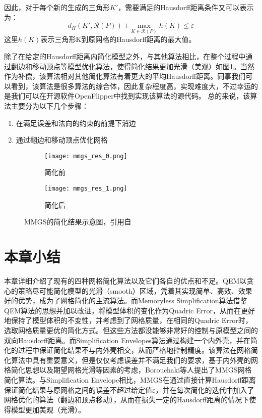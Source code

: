 因此，对于每个新的生成的三角形$K'$，需要满足的Hausdorff距离条件又可以表示为：
\begin{equation}
  d_H(K',\mathcal{R}(P))+\underset{K\in\mathcal{R}(P)}{\text{max}}\;h(K) \le \varepsilon
\end{equation}
这里$h(K)$表示三角形K到原网格的Hausdorff距离的最大值。\par
除了在给定的Hausdorff距离内简化模型之外，与其他算法相比，在整个过程中通过翻边和移动顶点等模型优化算法，使得简化结果更加光滑（美观）如图\ref{fig:mmgs-res}。当然作为补偿，该算法相对其他简化算法有着更大的平均Hausdorff距离。同事我们可以看到，该算法是很多算法的综合体，因此复杂程度高，实现难度大，不过幸运的是我们可以在开源软件OpenFlipper中找到实现该算法的源代码。
总的来说，该算法主要分为以下几个步骤：
\begin{enumerate}
  \item 在满足误差和法向的约束的前提下消边
  \item 通过翻边和移动顶点优化网格
\end{enumerate}
\begin{figure}[htbp]
  \centering
  \begin{subfigure}[b]{0.4\textwidth}
    \texttt{[image: mmgs\_res\_0.png]}
    \caption[input]{简化前}
    \end{subfigure}
    \begin{subfigure}[b]{0.4\textwidth}
      \texttt{[image: mmgs\_res\_1.png]}
      \caption[mls]{简化后}
    \end{subfigure}
    \caption[Result]{MMGS的简化结果示意图，引用自\cite{mmgs}}
    \label{fig:mmgs-res}
\end{figure}

\section{本章小结}
本章详细介绍了现有的四种网格简化算法以及它们各自的优点和不足。QEM\cite{qem1}\cite{qem2}以贪心的策略尽可能简化模型的光滑（smooth）区域，凭着其实现简单、高效、效果好的优势，成为了网格简化的主流算法。而Memoryless Simplification算法\cite{memory-less}借鉴QEM算法的思想并加以改进，将模型体积的变化作为Quadric Error，从而在更好地保持了模型体积的不变性，并考虑到了网格质量，在相同的Quadric Error时，选取网格质量更优的简化方式。但这些方法都没能够非常好的控制与原模型之间的双向Hausdorff距离。而Simplification Envelopes算法\cite{simp-envlop}通过构建一个内外壳，并在简化的过程中保证简化结果不与内外壳相交，从而严格地控制精度。该算法在网格简化算法中具有重要意义，但是仅仅考虑误差并不满足我们的要求，基于内外壳的网格简化思想以及期望网格光滑等因素的考虑，Borouchaki等人提出了MMGS网格简化算法\cite{mmgs}。与Simplification Envelope相比，MMGS在通过直接计算Hausdorff距离保证简化结果与原网格之间的误差不超过给定值$\varepsilon$，并在每次简化的迭代中加入了网格优化的算法（翻边和顶点移动），从而在损失一定的Hausdorff距离的情况下使得模型更加美观（光滑）。
